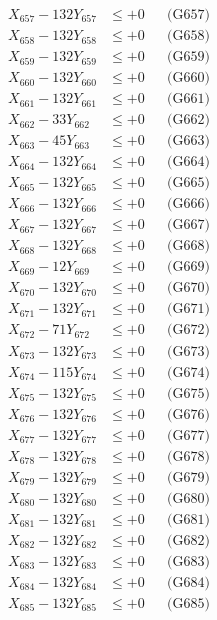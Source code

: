 \documentclass[a4paper,10pt]{article}
\begin{document}
{\begin{align}
X_{657} - 132Y_{657} &\leq +0 && \text{(G657)} \\
X_{658} - 132Y_{658} &\leq +0 && \text{(G658)} \\
X_{659} - 132Y_{659} &\leq +0 && \text{(G659)} \\
X_{660} - 132Y_{660} &\leq +0 && \text{(G660)} \\
\allowbreak
X_{661} - 132Y_{661} &\leq +0 && \text{(G661)} \\
X_{662} - 33Y_{662} &\leq +0 && \text{(G662)} \\
X_{663} - 45Y_{663} &\leq +0 && \text{(G663)} \\
X_{664} - 132Y_{664} &\leq +0 && \text{(G664)} \\
X_{665} - 132Y_{665} &\leq +0 && \text{(G665)} \\
X_{666} - 132Y_{666} &\leq +0 && \text{(G666)} \\
X_{667} - 132Y_{667} &\leq +0 && \text{(G667)} \\
X_{668} - 132Y_{668} &\leq +0 && \text{(G668)} \\
X_{669} - 12Y_{669} &\leq +0 && \text{(G669)} \\
X_{670} - 132Y_{670} &\leq +0 && \text{(G670)} \\
\allowbreak
X_{671} - 132Y_{671} &\leq +0 && \text{(G671)} \\
X_{672} - 71Y_{672} &\leq +0 && \text{(G672)} \\
X_{673} - 132Y_{673} &\leq +0 && \text{(G673)} \\
X_{674} - 115Y_{674} &\leq +0 && \text{(G674)} \\
X_{675} - 132Y_{675} &\leq +0 && \text{(G675)} \\
X_{676} - 132Y_{676} &\leq +0 && \text{(G676)} \\
X_{677} - 132Y_{677} &\leq +0 && \text{(G677)} \\
X_{678} - 132Y_{678} &\leq +0 && \text{(G678)} \\
X_{679} - 132Y_{679} &\leq +0 && \text{(G679)} \\
X_{680} - 132Y_{680} &\leq +0 && \text{(G680)} \\
\allowbreak
X_{681} - 132Y_{681} &\leq +0 && \text{(G681)} \\
X_{682} - 132Y_{682} &\leq +0 && \text{(G682)} \\
X_{683} - 132Y_{683} &\leq +0 && \text{(G683)} \\
X_{684} - 132Y_{684} &\leq +0 && \text{(G684)} \\
X_{685} - 132Y_{685} &\leq +0 && \text{(G685)} \\

\end{align}}
\end{document}

